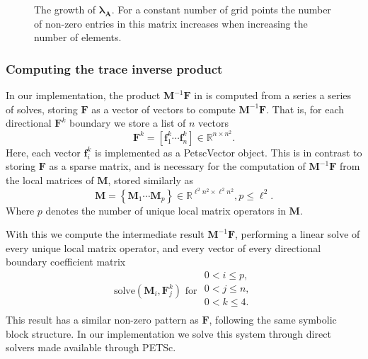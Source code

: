 \begin{figure}[h]
	\centering
	
	\caption{The growth of $\symbf{\lambda}_\textbf{A}$. For a constant number of grid points the number of non-zero entries in this matrix increases when increasing the number of elements.}
	\label{fig:lambda_diagram}
\end{figure}

%
%
%
\subsubsection{Computing the trace inverse product}

%
%
%
\noindent
In our implementation, the product $\textbf{M}^{-1}\textbf{F}$ in  is computed from a series a series of solves, storing $\textbf{F}$ as a vector of vectors to compute $\textbf{M}^{-1}\textbf{F}$. 
That is, for each directional $\textbf{F}^k$ boundary we store a list of $n$ vectors
\begin{equation}
	\textbf{F}^k = \left[\textbf{f}^k_1 \cdots \textbf{f}^k_n\right] 
	\in \mathbb{R}^{n \times n^2}.
\end{equation} 
\noindent
Here, each vector $\textbf{f}^k_i$ is implemented as a PetscVector object.
This is in contrast to storing $\textbf{F}$ as a sparse matrix, and is necessary for the computation of $\textbf{M}^{-1}\textbf{F}$ from the local 
matrices of $\textbf{M}$, stored similarly as
\begin{equation}
	\textbf{M} = \left\{\textbf{M}_1 \cdots \textbf{M}_p\right\} \in 
	\mathbb{R}^{\ell^2 n^2 \times \ell^2 n^2}, p \leq \ell^2.
\end{equation} 
\noindent 
Where $p$ denotes the number of unique local matrix operators in 
$\textbf{M}$. 

%
%
%
With this we compute the intermediate result $\textbf{M}^{-1}\textbf{F}$, performing a linear solve of every unique local matrix operator, and every vector of every directional boundary coefficient matrix 
\begin{equation}
	\text{solve}(\textbf{M}_{i}, \textbf{F}^{k}_j) \text{  for }
	\begin{array}{l}
		0 < i \leq p, \\
		0 < j \leq n, \\
		0 < k \leq 4. \\ 
	\end{array}
	\label{eqn:mfsolves}
\end{equation}
\noindent
This result has a similar non-zero pattern as $\textbf{F}$, following the same symbolic block structure. 
In our implementation we solve this system through direct solvers made available through PETSc. 

